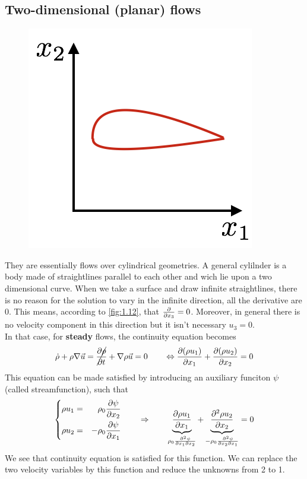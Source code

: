 	\subsection{Two-dimensional (planar) flows}
	
		\begin{figure}
		\vspace{-5mm}
		\includegraphics[scale=0.4]{ch1/12}
		\label{fig:1.12}
		\end{figure}
		They are essentially flows over cylindrical geometries. A general cylilnder is a body made of straightlines parallel to each other and wich lie upon a two dimensional curve. When we take a surface and draw infinite straightlines, there is no reason for the solution to vary in the infinite direction, all the derivative are 0. This means, according to \autoref{fig:1.12}, that $\frac{\D}{\D x_3}=0$. Moreover, in general there is no velocity component in this direction but it isn't necessary $u_3 = 0$.\\
		
		In that case, for \textbf{steady} flows, the continuity equation becomes 
		\begin{equation}
			\dot{\rho} + \rho \nabla \vec{u} = \cancel{\frac{\D \rho}{\D t}} + \nabla \rho \vec{u} = 0 \qquad \Leftrightarrow \frac{\D (\rho u_1)}{\D x_1} + \frac{\D (\rho u_2)}{\D x_2} = 0
		\end{equation}
		This equation can be made satisfied by introducing an auxiliary funciton $\psi$ (called streamfunction), such that  
		\begin{equation}
		\left\{
		\begin{aligned}
			\rho u_1 &= &\rho _0 \frac{\D\psi}{\D x_2}\\
			\rho u_2 &= &-\rho _0 \frac{\D\psi}{\D x_1}
		\end{aligned}
		\right.
		\qquad \Rightarrow \qquad \underbrace{\frac{\D \rho u_1}{\D x_1}}_{\rho _0 \frac{\D ^2 \psi}{\D x_1 \D x_2}} + \underbrace{\frac{\partial ^2 \rho u_2}{\D x_2}}_{-\rho _0 \frac{\D ^2 \psi}{\D x_2 \D x_1}} = 0
		\label{eq:1.107}
		\end{equation}
		We see that continuity equation is satisfied for this function.  We can replace the two velocity variables by this function and reduce the unknowns from 2 to 1. 
		
